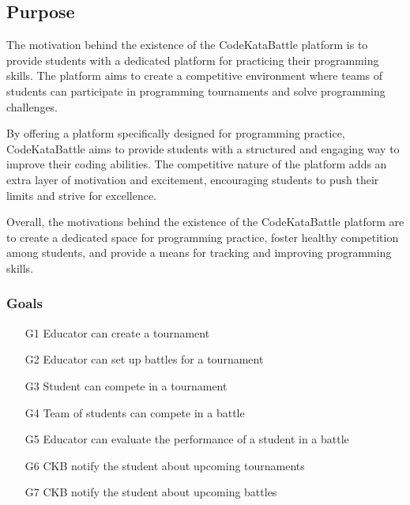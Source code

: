 \setlength{\headheight}{13.59999pt}
\addtolength{\topmargin}{-1.59999pt}

\subsection{Purpose}
The motivation behind the existence of the CodeKataBattle platform is to provide students with a dedicated platform for practicing their programming skills. The platform aims to create a competitive environment where teams of students can participate in programming tournaments and solve programming challenges.

By offering a platform specifically designed for programming practice, CodeKataBattle aims to provide students with a structured and engaging way to improve their coding abilities. The competitive nature of the platform adds an extra layer of motivation and excitement, encouraging students to push their limits and strive for excellence.

Overall, the motivations behind the existence of the CodeKataBattle platform are to create a dedicated space for programming practice, foster healthy competition among students, and provide a means for tracking and improving programming skills.

\subsubsection{Goals}
\begin{enumerate}
    \item[G1] Educator can create a tournament
    \item[G2] Educator can set up battles for a tournament
    \item[G3] Student can compete in a tournament
    \item[G4] Team of students can compete in a battle
    \item[G5] Educator can evaluate the performance of a student in a battle
    \item[G6] CKB notify the student about upcoming tournaments
    \item[G7] CKB notify the student about upcoming battles
\end{enumerate}

